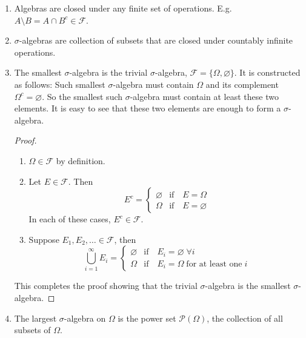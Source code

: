 \begin{notes}
\begin{enumerate}
	\item Algebras are closed under any finite set of operations. E.g. $A\setminus B=A\cap B^c\in\mathcal F$.
	\item $\sigma$-algebras are collection of subsets that are closed under countably infinite operations.
	\item The smallest $\sigma$-algebra is the trivial $\sigma$-algebra, $\mathcal F=\{\Omega, \varnothing \}$. It is constructed as follows: Such smallest $\sigma$-algebra must contain $\Omega$ and its complement $\Omega^c=\varnothing$. So the smallest such $\sigma$-algebra must contain at least these two elements. It is easy to see that these two elements are enough to form a $\sigma$-algebra.
	\begin{proof}
	\begin{enumerate}[label=(\emph{\roman*})]
		\item $\Omega\in \mathcal F$ by definition.
		\item Let $E\in \mathcal F$. Then 
		\begin{equation*}
			E^c=
			\begin{cases}
			\varnothing & \text{if} \quad E=\Omega\\
			\Omega & \text{if}\quad E=\varnothing
			\end{cases}
		\end{equation*}
		In each of these cases, $E^c\in\mathcal F$.
	\item Suppose $E_1, E_2,\ldots \in\mathcal F$, then
		\begin{equation*}
			\bigcup_{i=1}^\infty E_i=
			\begin{cases}
			\varnothing & \text{if} \quad E_i=\varnothing \; \forall i\\
			\Omega & \text{if}\quad E_i=\Omega\; \text{for at least one}\; i
			\end{cases}
		\end{equation*}
	\end{enumerate}
	This completes the proof showing that the trivial $\sigma$-algebra is the smallest 
	$\sigma$-algebra.
	\end{proof}
	\item The largest $\sigma$-algebra on $\Omega$ is the power set $\mathcal{P}(\Omega)$, 
	the collection of all subsets of $\Omega$.
\end{enumerate}
\end{notes}

